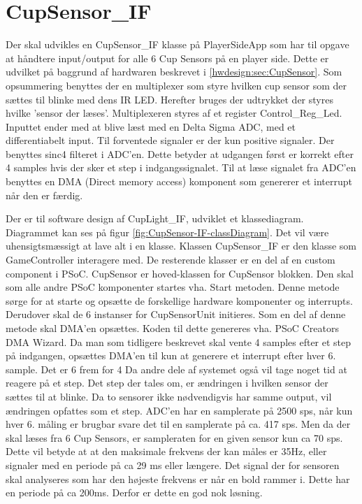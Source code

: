 \documentclass[Softwaredesign/Softwaredesign_main.tex]{subfiles}
\begin{document}
\section{CupSensor\_IF}
Der skal udvikles en CupSensor\_IF klasse på PlayerSideApp som har til opgave at håndtere input/output for alle 6 Cup Sensors på en player side. Dette er udvilket på baggrund af hardwaren beskrevet i \ref{hwdesign:sec:CupSensor}. Som opsummering benyttes der en multiplexer som styre hvilken cup sensor som der sættes til blinke med dens IR LED. Herefter bruges der udtrykket der styres hvilke 'sensor der læses'. Multiplexeren styres af et register Control\_Reg\_Led. Inputtet ender med at blive læst med en Delta Sigma ADC, med et differentiabelt input. Til forventede signaler er der kun positive signaler. Der benyttes sinc4 filteret i ADC'en. Dette betyder at udgangen først er korrekt efter 4 samples hvis der sker et step i indgangssignalet. Til at læse signalet fra ADC'en benyttes en DMA (Direct memory access) komponent som genererer et interrupt når den er færdig.

Der er til software design af CupLight\_IF, udviklet et klassediagram. Diagrammet kan ses på figur \ref{fig:CupSensor-IF-classDiagram}. Det vil være uhensigtsmæssigt at lave alt i en klasse. Klassen CupSensor\_IF er den klasse som GameController interagere med. De resterende klasser er en del af en custom component i PSoC\autocite{PSoCHowToCreateCustomComponents}. CupSensor er hoved-klassen for CupSensor blokken. Den skal som alle andre PSoC komponenter startes vha. Start metoden. Denne metode sørge for at starte og opsætte de forskellige hardware komponenter og interrupts. Derudover skal de 6 instanser for CupSensorUnit initieres. Som en del af denne metode skal DMA'en opsættes. Koden til dette genereres vha. PSoC Creators DMA Wizard\autocite[2]{DMADatasheet}. Da man som tidligere beskrevet skal vente 4 samples efter et step på indgangen, opsættes DMA'en til kun at generere et interrupt efter hver 6. sample. Det er 6 frem for 4 Da andre dele af systemet også vil tage noget tid at reagere på et step. Det step der tales om, er ændringen i hvilken sensor der sættes til at blinke. Da to sensorer ikke nødvendigvis har samme output, vil ændringen opfattes som et step. ADC'en har en samplerate på 2500 sps, når kun hver 6. måling er brugbar svare det til en samplerate på ca. 417 sps. Men da der skal læses fra 6 Cup Sensors, er sampleraten for en given sensor kun ca 70 sps. Dette vil betyde at at den maksimale frekvens der kan måles er 35Hz, eller signaler med en periode på ca 29 ms eller længere. Det signal der for sensoren skal analyseres som har den højeste frekvens er når en bold rammer i. Dette har en periode på ca 200ms. Derfor er dette en god nok løsning.
\end{document}

